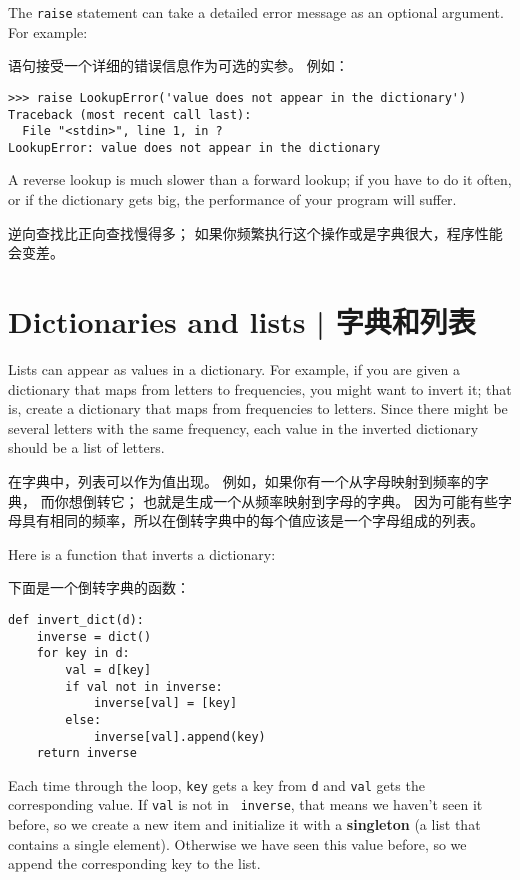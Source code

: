   

The {\tt raise} statement can take a detailed error message as an
optional argument.  For example:

 语句接受一个详细的错误信息作为可选的实参。  例如：

\begin{lstlisting}
>>> raise LookupError('value does not appear in the dictionary')
Traceback (most recent call last):
  File "<stdin>", line 1, in ?
LookupError: value does not appear in the dictionary
\end{lstlisting}

%
A reverse lookup is much slower than a forward lookup; if you
have to do it often, or if the dictionary gets big, the performance
of your program will suffer.

逆向查找比正向查找慢得多； 如果你频繁执行这个操作或是字典很大，程序性能会变差。

\section{Dictionaries and lists  |  字典和列表}
\label{invert}

Lists can appear as values in a dictionary.  For example, if you
are given a dictionary that maps from letters to frequencies, you
might want to invert it; that is, create a dictionary that maps
from frequencies to letters.  Since there might be several letters
with the same frequency, each value in the inverted dictionary
should be a list of letters.

在字典中，列表可以作为值出现。
例如，如果你有一个从字母映射到频率的字典， 而你想倒转它；
也就是生成一个从频率映射到字母的字典。
因为可能有些字母具有相同的频率，所以在倒转字典中的每个值应该是一个字母组成的列表。

  

Here is a function that inverts a dictionary:

下面是一个倒转字典的函数：

\begin{lstlisting}
def invert_dict(d):
    inverse = dict()
    for key in d:
        val = d[key]
        if val not in inverse:
            inverse[val] = [key]
        else:
            inverse[val].append(key)
    return inverse
\end{lstlisting}

%
Each time through the loop, {\tt key} gets a key from {\tt d} and
{\tt val} gets the corresponding value.  If {\tt val} is not in {\tt
  inverse}, that means we haven't seen it before, so we create a new
item and initialize it with a {\bf singleton} (a list that contains a
single element).  Otherwise we have seen this value before, so we
append the corresponding key to the list.  

